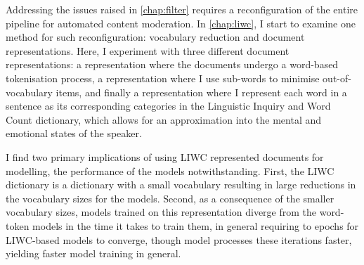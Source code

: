%

Addressing the issues raised in \cref{chap:filter} requires a reconfiguration of the entire pipeline for automated content moderation.
In \cref{chap:liwc}, I start to examine one method for such reconfiguration: vocabulary reduction and document representations.
Here, I experiment with three different document representations: a representation where the documents undergo a word-based tokenisation process, a representation where I use sub-words to minimise out-of-vocabulary items, and finally a representation where I represent each word in a sentence as its corresponding categories in the Linguistic Inquiry and Word Count \citep[LIWC,]{Pennebaker:2001} dictionary, which allows for an approximation into the mental and emotional states of the speaker.

I find two primary implications of using LIWC represented documents for modelling, the performance of the models notwithstanding.
First, the LIWC dictionary is a dictionary with a small vocabulary resulting in large reductions in the vocabulary sizes for the models.
Second, as a consequence of the smaller vocabulary sizes, models trained on this representation diverge from the word-token models in the time it takes to train them, in general requiring to epochs for LIWC-based models to converge, though model processes these iterations faster, yielding faster model training in general.









